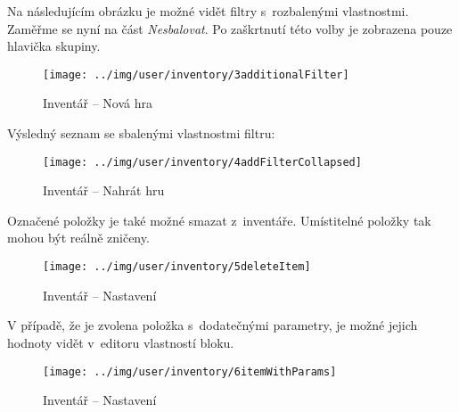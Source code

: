 \FloatBarrier

Na následujícím obrázku je možné vidět filtry s~rozbalenými vlastnostmi. Zaměřme se nyní na část \textit{Nesbalovat}. Po zaškrtnutí této volby je zobrazena pouze hlavička skupiny.

\begin{figure}[!ht]\centering
\texttt{[image: ../img/user/inventory/3additionalFilter]}

\caption{Inventář -- Nová hra}
\label{fig:user_inventory_3additionalFilter}

\end{figure}

\FloatBarrier

Výsledný seznam se sbalenými vlastnostmi filtru:

\begin{figure}[!ht]\centering
\texttt{[image: ../img/user/inventory/4addFilterCollapsed]}

\caption{Inventář -- Nahrát hru}
\label{fig:user_inventory_4addFilterCollapsed}

\end{figure}

\FloatBarrier

Označené položky je také možné smazat z~inventáře. Umístitelné položky tak mohou být reálně zničeny. 

\begin{figure}[!ht]\centering
\texttt{[image: ../img/user/inventory/5deleteItem]}

\caption{Inventář -- Nastavení}
\label{fig:user_inventory_5deleteItem}

\end{figure}

\FloatBarrier
V případě, že je zvolena položka s~dodatečnými parametry, je možné jejich hodnoty vidět v~editoru vlastností bloku.

\begin{figure}[!ht]\centering
\texttt{[image: ../img/user/inventory/6itemWithParams]}

\caption{Inventář -- Nastavení}
\label{fig:user_inventory_6itemWithParams}

\end{figure}


\FloatBarrier